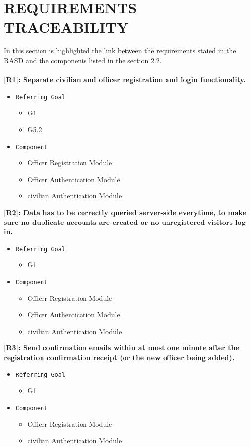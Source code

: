 \documentclass[12pt,a4paper]{article}
\begin{document}
\section{REQUIREMENTS TRACEABILITY}
In this section is highlighted the link between the requirements stated in the RASD and the components listed in the section 2.2.\\\\

\textbf{[R1]: Separate civilian and officer registration and login functionality.}
\begin{itemize}
	\item \texttt{Referring Goal}
	\begin{itemize}
		\item G1
		\item G5.2
	\end{itemize}
	\item \texttt{Component}
	\begin{itemize}
		\item Officer Registration Module 	\item Officer Authentication Module 	\item civilian Authentication Module
	\end{itemize}
\end{itemize}
\textbf{	[R2]: Data has to be correctly queried server-side everytime, to make sure no duplicate accounts are created or no unregistered visitors log in. }
\begin{itemize}
	\item \texttt{Referring Goal}
	\begin{itemize}
		\item G1
	\end{itemize}
	\item \texttt{Component}
	\begin{itemize}
		\item Officer Registration Module
		\item Officer Authentication Module
		\item civilian Authentication Module
	\end{itemize}
\end{itemize}
\textbf{[R3]: Send confirmation emails within at most one minute after the registration confirmation receipt (or the new officer being added). }
\begin{itemize}
	\item \texttt{Referring Goal}
	\begin{itemize}
		\item G1
	\end{itemize}
	\item \texttt{Component}
	\begin{itemize}
		\item Officer Registration Module 	\item civilian Authentication Module
	\end{itemize}
\end{itemize}
\end{document}
